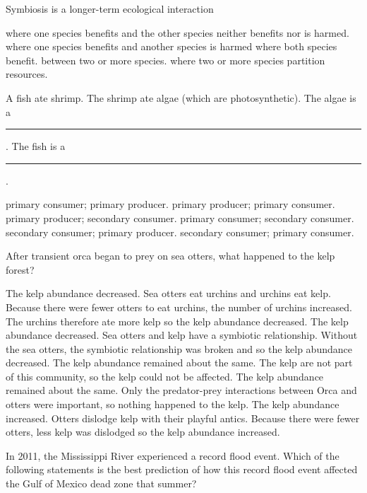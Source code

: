 \question
Symbiosis is a longer-term ecological interaction

\begin{choices}
	\choice  where one species benefits and the other species neither benefits nor is harmed. 
	\choice where one species benefits and another species is harmed 
	\choice where both species benefit. 
	\correctchoice between two or more species. 
	\choice where two or more species partition resources. 
\end{choices}

\question
A fish ate shrimp. The shrimp ate algae (which are photosynthetic).  The algae is a \rule{1in}{0.4pt}. The fish is a \rule{1in}{0.4pt}.

\begin{choices}
\choice primary consumer; primary producer. 
\choice primary producer; primary consumer. 
\correctchoice primary producer; secondary consumer. 
\choice primary consumer; secondary consumer. 
\choice secondary consumer; primary producer. 
\choice secondary consumer; primary consumer. 
\end{choices}

\newpage

\question
After transient orca began to prey on sea otters, what happened to the kelp forest?

\begin{choices}
\correctchoice The kelp abundance decreased. Sea otters eat urchins and urchins eat kelp.  Because there were fewer otters to eat urchins, the number of urchins increased.  The urchins therefore ate more kelp so the kelp abundance decreased.
\choice The kelp abundance decreased. Sea otters and kelp have a symbiotic relationship. Without the sea otters, the symbiotic relationship was broken and so the kelp abundance decreased.
\choice The kelp abundance remained about the same. The kelp are not part of this community, so the kelp could not be affected.
\choice The kelp abundance remained about the same. Only the predator-prey interactions between Orca and otters were important, so nothing happened to the kelp.
\choice The kelp abundance increased. Otters dislodge kelp with their playful antics.  Because there were fewer otters, less kelp was dislodged so the kelp abundance increased.
\end{choices}

\question
In 2011, the Mississippi River experienced a record flood event.  Which of the following statements is the best prediction of how this record flood event affected the Gulf of Mexico dead zone that summer?

